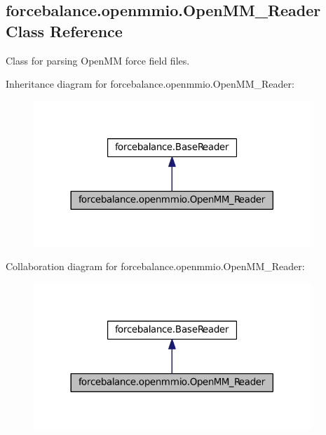 \hypertarget{classforcebalance_1_1openmmio_1_1OpenMM__Reader}{\subsection{forcebalance.\-openmmio.\-Open\-M\-M\-\_\-\-Reader \-Class \-Reference}
\label{classforcebalance_1_1openmmio_1_1OpenMM__Reader}
}


\-Class for parsing \-Open\-M\-M force field files.  




\-Inheritance diagram for forcebalance.\-openmmio.\-Open\-M\-M\-\_\-\-Reader\-:
\nopagebreak
\begin{figure}[H]
\begin{center}
\leavevmode
\includegraphics[width=296pt]{classforcebalance_1_1openmmio_1_1OpenMM__Reader__inherit__graph}
\end{center}
\end{figure}


\-Collaboration diagram for forcebalance.\-openmmio.\-Open\-M\-M\-\_\-\-Reader\-:
\nopagebreak
\begin{figure}[H]
\begin{center}
\leavevmode
\includegraphics[width=296pt]{classforcebalance_1_1openmmio_1_1OpenMM__Reader__coll__graph}
\end{center}
\end{figure}
